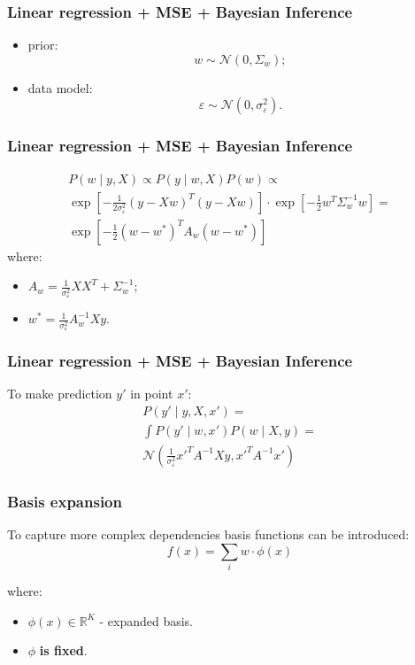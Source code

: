 \documentclass[mathserif, aspectratio=43]{beamer}
\begin{document}
\begin{frame}[fragile]
\frametitle{Linear regression + MSE + Bayesian Inference}
\begin{itemize}
\item prior:
$$w \sim \mathcal{N}(0, \Sigma_w);$$
\item data model:
$$\varepsilon \sim \mathcal{N}(0, \sigma^2_\varepsilon).$$
\end{itemize}

\end{frame}


\begin{frame}[fragile]
\frametitle{Linear regression + MSE + Bayesian Inference}
\begin{multline*}
P(w \mid y, X) \propto P(y \mid w, X) P(w) \propto \\[3mm]
  \exp\left[ - \frac{1}{2 \sigma^2_\varepsilon} (y - X w)^T (y - X w) \right] \cdot \exp\left[ -\frac{1}{2} w^T \Sigma^{-1}_w w \right] = \\[3mm]
  \exp\left[ - \frac{1}{2} (w - w^*)^T A_w (w - w^*) \right]
\end{multline*}
where:
\begin{itemize}
\item $A_w = \frac{1}{\sigma^{2}_\varepsilon}X X^T + \Sigma^{-1}_w$;
\item $w^* = \frac{1}{\sigma^{2}_\varepsilon} A^{-1}_w X y$.
\end{itemize}

\end{frame}


\begin{frame}[fragile]
\frametitle{Linear regression + MSE + Bayesian Inference}
To make prediction $y'$ in point $x'$:
\begin{multline*}
P(y' \mid y, X, x') = \\
  \int P(y' \mid w, x') P(w \mid X, y) = \\
  \mathcal{N}\left( \frac{1}{\sigma^2_\varepsilon} x'^T A^{-1} X y, x'^T A^{-1} x' \right)
\end{multline*}

\end{frame}


\begin{frame}[fragile]
\frametitle{Basis expansion}
To capture more complex dependencies basis functions can be introduced:
$$f(x) = \sum_i w \cdot \phi(x)$$

where:
\begin{itemize}
\item $\phi(x) \in \mathbb{R}^K$ - expanded basis.
\item $\phi$ \textbf{is fixed}.
\end{itemize}

\end{frame}
\end{document}
